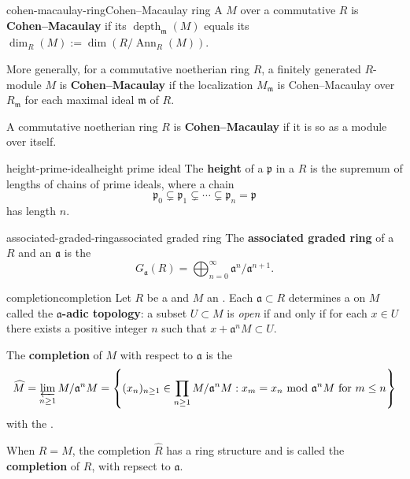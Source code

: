 \begin{topic}{cohen-macaulay-ring}{Cohen--Macaulay ring}
    A   $M$ over a commutative    $R$ is \textbf{Cohen--Macaulay} if its  $\operatorname{depth}_{\mathfrak{m}}(M)$ equals its  $\dim_R(M) := \dim(R/\operatorname{Ann}_R(M))$.
    
    More generally, for a commutative noetherian ring $R$, a finitely generated $R$-module $M$ is \textbf{Cohen--Macaulay} if the localization $M_\mathfrak{m}$ is Cohen--Macaulay over $R_\mathfrak{m}$ for each maximal ideal $\mathfrak{m}$ of $R$.
    
    A commutative noetherian ring $R$ is \textbf{Cohen--Macaulay} if it is so as a module over itself.
\end{topic}

\begin{topic}{height-prime-ideal}{height prime ideal}
    The \textbf{height} of a  $\mathfrak{p}$ in a  $R$ is the supremum of lengths of chains of prime ideals, where a chain
    \[ \mathfrak{p}_0 \subsetneq \mathfrak{p}_1 \subsetneq \cdots \subsetneq \mathfrak{p}_n = \mathfrak{p} \]
    has length $n$.
\end{topic}

\begin{topic}{associated-graded-ring}{associated graded ring}
    The \textbf{associated graded ring} of a  $R$ and an  $\mathfrak{a}$ is the 
    \[ G_\mathfrak{a}(R) = \bigoplus_{n = 0}^{\infty} \mathfrak{a}^n / \mathfrak{a}^{n + 1} . \]
\end{topic}

\begin{topic}{completion}{completion}
    Let $R$ be a  and $M$ an . Each  $\mathfrak{a} \subset R$ determines a  on $M$ called the \textbf{$\mathfrak{a}$-adic topology}: a subset $U \subset M$ is \textit{open} if and only if for each $x \in U$ there exists a positive integer $n$ such that $x + \mathfrak{a}^n M \subset U$.
    
    The \textbf{completion} of $M$ with respect to $\mathfrak{a}$ is the 
    \[ \widehat{M} = \varprojlim_{n \ge 1} M / \mathfrak{a}^n M = \left\{ (x_n)_{n \ge 1} \in \prod_{n \ge 1} M / \mathfrak{a}^n M : x_m = x_n \mod \mathfrak{a}^n M \textup{ for } m \le n \right\} \]
    with the  .
    
    When $R = M$, the completion $\widehat{R}$ has a ring structure and is called the \textbf{completion} of $R$, with repsect to $\mathfrak{a}$.
\end{topic}

